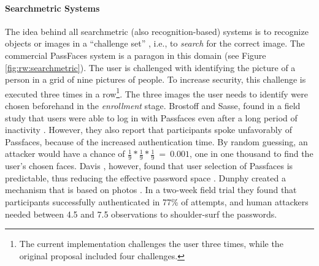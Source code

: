 	\paragraph{Searchmetric Systems}
	The idea behind all searchmetric (also recognition-based) systems is to recognize objects or images in a ``challenge set'' \cite{VonZezschwitz2016Thesis}, i.e., to \textit{search} for the correct image. The commercial PassFaces system is a paragon in this domain (see Figure \ref{fig:rw:searchmetric}). The user is challenged with identifying the picture of a person in a grid of nine pictures of people. To increase security, this challenge is executed three times in a row\footnote{The current implementation challenges the user three times, while the original proposal included four challenges.}. The three images the user needs to identify were chosen beforehand in the \textit{enrollment} stage. Brostoff and Sasse, found in a field study that users were able to log in with Passfaces even after a long period of inactivity \cite{Brostoff2000PassfacesEvaluation}. However, they also report that participants spoke unfavorably of Passfaces, because of the increased authentication time. By random guessing, an attacker would have a chance of $\frac{1}{9}*\frac{1}{9}*\frac{1}{9}~=~0.001$, \ie one in one thousand to find the user's chosen faces. Davis \etal, however, found that user selection of Passfaces is predictable, thus reducing the effective password space \cite{Davis2004UserChoiceGraphical}. Dunphy \etal created a mechanism that is based on photos \cite{Dunphy2010CloserLookGraphical}. In a two-week field trial they found that participants successfully authenticated in 77\% of attempts, and human attackers needed between 4.5 and 7.5 observations to shoulder-surf the passwords. 
	
